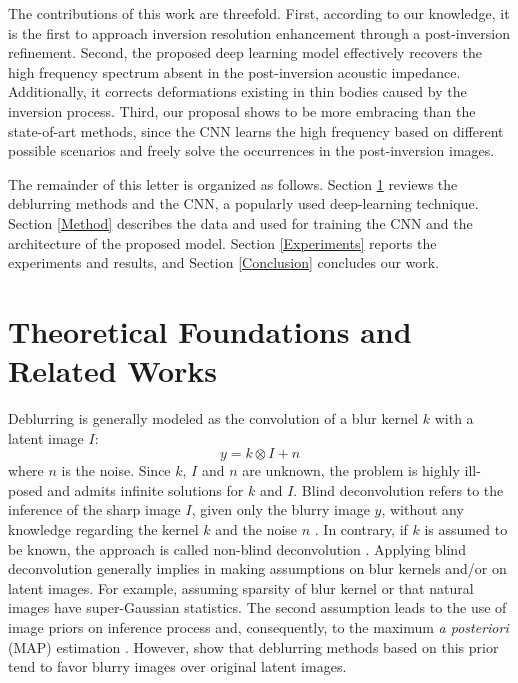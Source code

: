 \documentclass[journal]{IEEEtran}
\begin{document}
The contributions of this work are threefold. First,
according to our knowledge, it is the first to approach
inversion resolution enhancement through a post-inversion
refinement. Second, the proposed deep learning model
effectively recovers the high frequency spectrum absent
in the post-inversion acoustic impedance. Additionally, it
corrects deformations existing in thin bodies caused
by the inversion process. Third, our proposal
shows to be more embracing than the state-of-art
methods, since the CNN learns the high frequency
based on different possible scenarios and freely solve
the occurrences in the post-inversion images.

The remainder of this letter is organized as follows.
Section \ref{Theoretics} reviews the deblurring methods
and the CNN, a popularly used deep-learning technique.
Section \ref{Method} describes the data and used for
training the CNN and the architecture of the proposed model.
Section \ref{Experiments} reports the experiments and
results, and Section \ref{Conclusion} concludes our work.

\section{Theoretical Foundations and Related Works}\label{Theoretics}

Deblurring is generally modeled as the convolution of a blur kernel $k$
with a latent image $I$: 
\begin{equation}
 y = k \otimes I + n
 \label{eq:deblurr}
\end{equation}
where $n$ is the noise. Since $k$, $I$ and $n$ are unknown, the problem 
is highly ill-posed and admits infinite solutions for $k$ and $I$.
Blind deconvolution refers to the inference of the sharp image $I$,
given only the blurry image $y$, without any knowledge regarding the
kernel $k$ and the noise $n$ \cite{Zhang2013}. In contrary, if $k$
is assumed to be known, the approach is called non-blind deconvolution
\cite{Wang2009}.
Applying blind deconvolution generally implies in making assumptions
on blur kernels and/or on latent images. For example, assuming sparsity
of blur kernel or that natural images have super-Gaussian statistics.
The second assumption leads to the use of image priors on inference process
and, consequently, to the maximum \textit{a posteriori} (MAP) estimation
\cite{Babacan2012}. However, \cite{Levin} show that deblurring methods based
on this prior tend to favor blurry images over original latent images.
\end{document}
